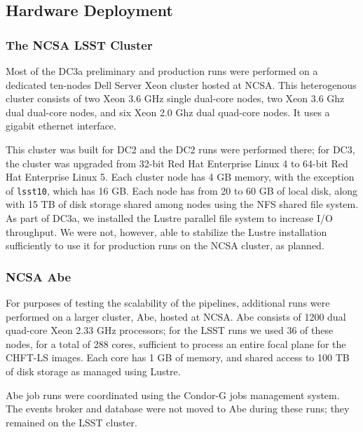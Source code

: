\subsection{Hardware Deployment}

\subsubsection{The NCSA LSST Cluster}

Most of the DC3a preliminary and production runs were performed on a dedicated 
ten-nodes Dell Server Xeon cluster hosted at NCSA. This heterogenous cluster 
consists of two Xeon 3.6 GHz single dual-core nodes, two Xeon 3.6 Ghz dual
dual-core nodes, and six Xeon 2.0 Ghz dual quad-core nodes. It uses a
gigabit ethernet interface.

This cluster was built for DC2 and the DC2 runs were performed there; for DC3, 
the cluster was upgraded from 32-bit Red Hat Enterprise Linux 4 to 64-bit
Red Hat Enterprise Linux 5. Each cluster node has 4 GB memory, with the exception
of \texttt{lsst10}, which has 16 GB. Each node has from 20 to 60 GB of local disk,
along with 15 TB of disk storage shared among nodes using the NFS shared file system.
As part of DC3a, we installed the Lustre parallel file system to increase I/O 
throughput. We were not, however, able to stabilize the Lustre installation
sufficiently to use it for production runs on the NCSA cluster, as planned.

\subsubsection{NCSA Abe}

For purposes of testing the scalability of the pipelines, additional runs were
performed on a larger cluster, Abe, hosted at NCSA. Abe consists of 1200
dual quad-core Xeon 2.33 GHz processors; for the LSST runs we used 36 of these 
nodes, for a total of 288 cores, sufficient to process an entire focal plane 
for the CHFT-LS images. Each core has 1 GB of memory, and shared access
to 100 TB of disk storage as managed using Lustre.

Abe job runs were coordinated using the Condor-G jobs management system.
The events broker and database were not moved to Abe during these runs;
they remained on the LSST cluster.
